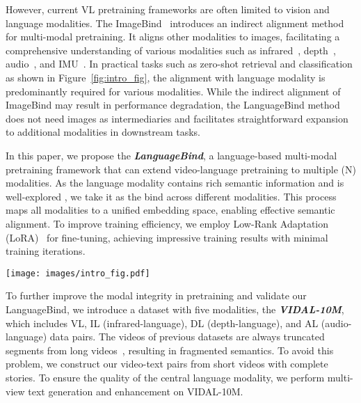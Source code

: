 \documentclass{article} \usepackage{iclr2024_conference,times}
\begin{document}
However, current VL pretraining frameworks are often limited to vision and language modalities.
The ImageBind~\citep{girdhar2023imagebind} introduces an indirect alignment method for multi-modal pretraining. It aligns other modalities to images, facilitating a comprehensive understanding of various modalities such as infrared~\citep{jia2021llvip}, depth~\citep{kim2022global}, audio~\citep{piczak2015esc}, and IMU~\citep{grauman2022ego4d}. In practical tasks such as zero-shot retrieval and classification as shown in Figure~\ref{fig:intro_fig}, the alignment with language modality is predominantly required for various modalities. While the indirect alignment of ImageBind may result in performance degradation, the LanguageBind method does not need images as intermediaries and facilitates straightforward expansion to additional modalities in downstream tasks.



In this paper, we propose the \textbf{\textit{LanguageBind}}, a language-based multi-modal pretraining framework that can extend video-language pretraining to multiple (N) modalities. As the language modality contains rich semantic information and is well-explored \citep{kenton2019bert, dai2019transformer}, we take it as the bind across different modalities. This process maps all modalities to a unified embedding space, enabling effective semantic alignment. To improve training efficiency, we employ Low-Rank Adaptation (LoRA)~\citep{hu2021lora} for fine-tuning, achieving impressive training results with minimal training iterations.


\begin{figure*}[t]
\centering
    \texttt{[image: images/intro\_fig.pdf]}     
\caption{\textbf{ImageBind vs. LanguageBind}. The ImageBind method relies on images as intermediaries, while the LanguageBind method dispenses with this requirement. LanguageBind directly aligns all modalities to the language space, thereby enhancing its applicability to downstream tasks. ``X'' represents all modalities except language, and ``c'' represents category.}
\label{fig:intro_fig}
\vspace{-0.4cm}
\end{figure*}

To further improve the modal integrity in pretraining and validate our LanguageBind, we introduce a dataset with five modalities, the \textbf{\textit{VIDAL-10M}}, which includes VL, IL (infrared-language), DL (depth-language), and AL (audio-language) data pairs. The videos of previous datasets are always truncated segments from long videos~\citep{miech2019howto100m,xue2022advancing}, resulting in fragmented semantics. To avoid this problem, we construct our video-text pairs from short videos with complete stories. To ensure the quality of the central language modality, we perform multi-view text generation and enhancement on VIDAL-10M.
\end{document}
